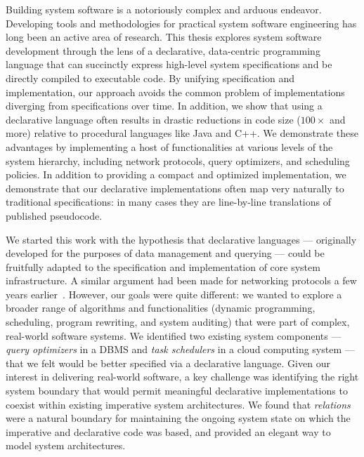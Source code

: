 
Building system software is a notoriously complex and arduous endeavor.
Developing tools and methodologies for practical system software engineering
has long been an active area of research.  This thesis explores system software
development through the lens of a declarative, data-centric programming
language that can succinctly express high-level system specifications and be
directly compiled to executable code.  By unifying specification and
implementation, our approach avoids the common problem of implementations
diverging from specifications over time.  In addition, we show that using a
declarative language often results in drastic reductions in code size
($100\times$ and more) relative to procedural languages like Java and C++.  We
demonstrate these advantages by implementing a host of functionalities at
various levels of the system hierarchy, including network protocols, query
optimizers, and scheduling policies.  In addition to providing a compact and
optimized implementation, we demonstrate that our declarative implementations
often map very naturally to traditional specifications: in many cases they are
line-by-line translations of published pseudocode.

We started this work with the hypothesis that declarative languages ---
originally developed for the purposes of data management and querying --- could
be fruitfully adapted to the specification and implementation of core system
infrastructure.  A similar argument had been made for networking protocols a
few years earlier~\cite{boon-thesis}.  However, our goals were quite different:
we wanted to explore a broader range of algorithms and functionalities (dynamic
programming, scheduling, program rewriting, and system auditing) that were part
of complex, real-world software systems.  We identified two existing system
components --- {\em query optimizers} in a DBMS and {\em task schedulers} in a
cloud computing system --- that we felt would be better specified via a
declarative language.  Given our interest in delivering real-world software, a
key challenge was identifying the right system boundary that would permit
meaningful declarative implementations to coexist within existing imperative
system architectures.  We found that {\em relations} were a natural boundary for
maintaining the ongoing system state on which the imperative and declarative
code was based, and provided an elegant way to model system architectures.

